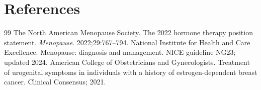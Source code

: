 \section*{References}
\begin{thebibliography}{99}
 The North American Menopause Society. The 2022 hormone therapy position statement. \textit{Menopause}. 2022;29:767--794.
 National Institute for Health and Care Excellence. Menopause: diagnosis and management. NICE guideline NG23; updated 2024.
 American College of Obstetricians and Gynecologists. Treatment of urogenital symptoms in individuals with a history of estrogen-dependent breast cancer. Clinical Consensus; 2021.
\end{thebibliography}

